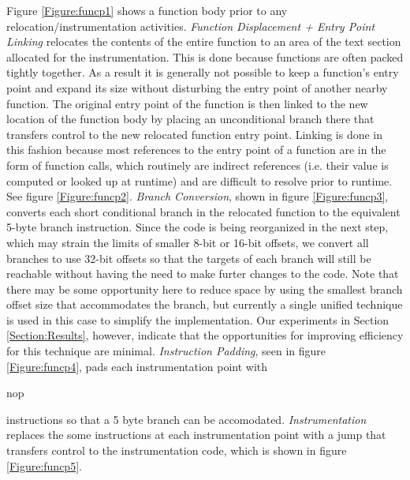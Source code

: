 \begin{figure}[ht]
{\label{Figure:funcp4}
}
\label{Figure:Relocation}
\end{figure}


Figure \ref{Figure:funcp1} shows a function body prior to any relocation/instrumentation activities.
\textit{Function Displacement + Entry Point Linking} relocates the contents of the entire function to an area of the text section allocated
for the instrumentation. This is done because functions are often packed tightly together. As a result it is generally not possible to keep a function's entry point and
expand its size without disturbing the entry point of another nearby function. The original entry point of the function is then linked to the new location
of the function body by placing an unconditional branch there that transfers control to the new relocated function entry point. 
Linking is done in this fashion because most references to the entry point of a function are in the form of function calls, which
routinely are indirect references (i.e. their value is computed or looked up at runtime) and are difficult to resolve
prior to runtime. See figure \ref{Figure:funcp2}. \textit{Branch Conversion}, shown in figure \ref{Figure:funcp3}, 
converts each short conditional branch in the relocated function to the equivalent
5-byte branch instruction. Since the code is being reorganized in the next step, which may strain the limits of
smaller 8-bit or 16-bit offsets, we convert all branches to use 32-bit offsets so that the targets of each branch
will still be reachable without having the need to make furter changes to the code. Note that there may be some opportunity
here to reduce space by using the smallest branch offset size that accommodates the branch, but currently a single 
unified technique is used in this case to simplify the implementation. Our experiments in Section \ref{Section:Results}, 
however, indicate that the opportunities for improving efficiency for this technique are minimal. \textit{Instruction Padding}, seen
in figure \ref{Figure:funcp4}, pads
each instrumentation point with \begin{it}nop\end{it} instructions so that a 5 byte branch can be accomodated. \textit{Instrumentation} replaces the
some instructions at each instrumentation point with a jump that transfers control to the instrumentation code, which is shown in figure
\ref{Figure:funcp5}.

